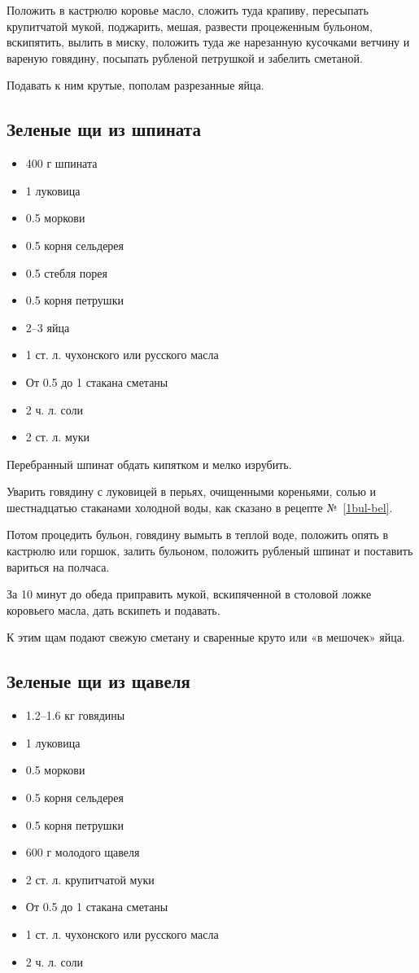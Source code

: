 Положить в кастрюлю коровье масло, сложить туда крапиву, пересыпать крупитчатой мукой, поджарить, мешая, развести процеженным бульоном, вскипятить, вылить в миску, положить туда же нарезанную кусочками ветчину и вареную говядину, посыпать рубленой петрушкой и забелить сметаной.

Подавать к ним крутые, пополам разрезанные яйца.

\subsection{Зеленые щи из шпината}\label{26shi-shpinat}

\begin{itemize}
	\item 400 г шпината 
	\item 1 луковица 
	\item 0.5 моркови 
	\item 0.5 корня сельдерея 
	\item 0.5 стебля порея 
	\item 0.5 корня петрушки 
	\item 2–3 яйца 
	\item 1 ст. л. чухонского или русского масла 
	\item От 0.5 до 1 стакана сметаны 
	\item 2 ч. л. соли 
	\item 2 ст. л. муки
\end{itemize}

Перебранный шпинат обдать кипятком и мелко изрубить.

Уварить говядину с луковицей в перьях, очищенными кореньями, солью и шестнадцатью стаканами холодной воды, как сказано в рецепте №~\ref{1bul-bel}.

Потом процедить бульон, говядину вымыть в теплой воде, положить опять в кастрюлю или горшок, залить бульоном, положить рубленый шпинат и поставить вариться на полчаса.

За 10 минут до обеда приправить мукой, вскипяченной в столовой ложке коровьего масла, дать вскипеть и подавать.

К этим щам подают свежую сметану и сваренные круто или «в мешочек» яйца.

\subsection{Зеленые щи из щавеля}\label{27shi-schavel}

\begin{itemize}
	\item 1.2–1.6 кг говядины 
	\item 1 луковица 
	\item 0.5 моркови 
	\item 0.5 корня сельдерея 
	\item 0.5 корня петрушки 
	\item 600 г молодого щавеля 
	\item 2 ст. л. крупитчатой муки 
	\item От 0.5 до 1 стакана сметаны 
	\item 1 ст. л. чухонского или русского масла 
	\item 2 ч. л. соли
\end{itemize}

